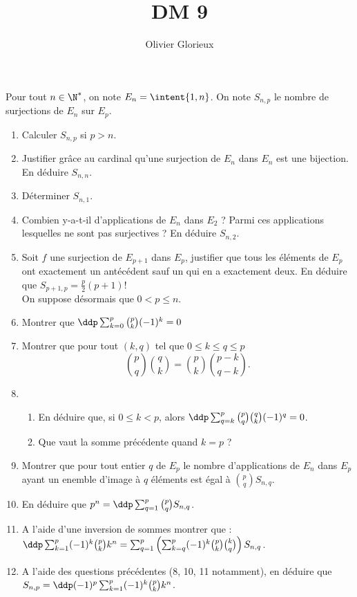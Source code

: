\documentclass[a4paper, 11pt,reqno]{article}
\author{Olivier Glorieux}
\begin{document}
\title{DM 9}


\begin{exercice}
Pour tout $n\in \N^*$, on note $E_n=\intent{1,n}$. 
On note $S_{n,p}$ le nombre de surjections de $E_n$ sur $E_p$. 
\begin{enumerate}
\item Calculer $S_{n,p}$ si $p>n$. 
\item Justifier grâce au cardinal qu'une surjection de $E_n$ dans $E_n$ est une bijection. En déduire $S_{n,n}$.
\item Déterminer $S_{n,1}$. 
\item Combien y-a-t-il d'applications de $E_n$ dans $E_2$ ? Parmi ces applications lesquelles ne sont pas surjectives ? En déduire $S_{n,2}$. 
\item Soit $f$ une surjection de $E_{p+1}$ dans $E_p$, justifier que tous les éléments de $E_p$ ont exactement un antécédent sauf un qui en a exactement deux. 
En déduire que $S_{p+1,p} = \frac{p}{2}(p+1)!$\\

On suppose désormais que $0< p \leq n$. 
\item Montrer que $\ddp \sum_{k=0}^p \binom{p}{k}(-1)^k=0$
\item Montrer que pour tout $(k,q)$ tel que $0\leq k \leq q \leq p $ 
$$\binom{p}{q}\binom{q}{k}=\binom{p}{k}\binom{p-k}{q-k}.$$
\item \begin{enumerate}
\item En déduire que, si 
$0\leq k <p$, alors $\ddp \sum_{q=k}^p \binom{p}{q}\binom{q}{k} (-1)^q =0$.
\item  Que vaut la somme précédente quand $k=p$ ?
\end{enumerate}

\item Montrer que pour tout entier $q$ de $E_p$ le nombre d'applications de $E_n$ dans $E_p$ ayant un enemble d'image à $q$ éléments est égal à $\binom{p}{q} S_{n,q}$. 
\item En déduire que $p^n =\ddp \sum_{q=1}^p\binom{p}{q} S_{n,q}$. 
\item A l'aide d'une inversion de sommes montrer que : $\ddp \sum_{k=1}^p (-1)^k \binom{p}{k}k^n=\sum_{q=1}^p \left(\sum_{k=q}^p (-1)^k \binom{p}{k}\binom{k}{q} \right) S_{n,q}  $.
\item A l'aide des questions précédentes (8, 10, 11 notamment), en déduire que $S_{n,p} = \ddp (-1)^p \sum_{k=1}^p (-1)^k \binom{p}{k}k^n$.\\


\end{enumerate}
\end{exercice}
\end{document}
